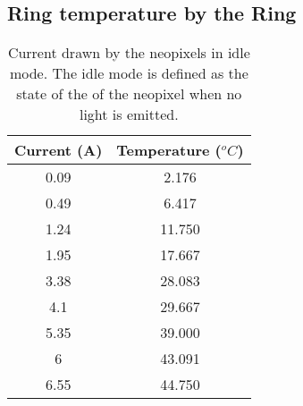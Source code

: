 \subsection{Ring temperature by the Ring}
\begin{table}[h!]
	\centering
	\caption{Current drawn by the neopixels in idle mode. The idle mode is defined as the state of the of the neopixel when no light is emitted.}
	\label{table:temperature_ring}
	\begin{tabular}{cc}
		\hline
		\hline
		\toprule
		\textbf{Current (A)} & \textbf{Temperature ($^oC$)}\\
		\bottomrule
		\toprule
		0.09    &    2.176    \\
		0.49    &    6.417    \\
		1.24    &    11.750    \\
		1.95    &    17.667    \\
		3.38    &    28.083    \\
		4.1        &    29.667    \\
		5.35    &    39.000    \\
		6        &    43.091    \\
		6.55    &    44.750    \\
		\bottomrule
		\hline
		\hline
	\end{tabular}
\end{table}

